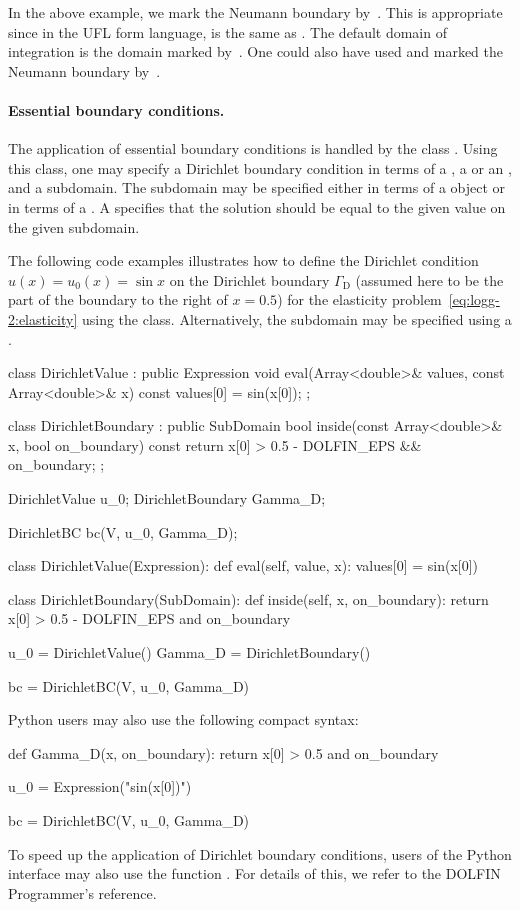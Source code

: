 In the above example, we mark the Neumann boundary by~. This is
appropriate since in the UFL form language,  is the same as
. The default domain of integration is the domain marked
by~. One could also have used  and marked the
Neumann boundary by~.

\paragraph{Essential boundary conditions.}

The application of essential boundary conditions is handled by the
class . Using this class, one may specify a Dirichlet
boundary condition in terms of a , a 
or an , and a subdomain. The subdomain may be
specified either in terms of a  object or in terms of a
. A  specifies that the solution
should be equal to the given value on the given subdomain.

The following code examples illustrates how to define the Dirichlet
condition $u(x) = u_0(x) = \sin x$ on the Dirichlet boundary
$\Gamma_{\mathrm{D}}$ (assumed here to be the part of the boundary
to the right of $x = 0.5$) for the elasticity
problem~\eqref{eq:logg-2:elasticity} using the 
class. Alternatively, the subdomain may be specified using a
.
\begin{c++}
class DirichletValue : public Expression
{
  void eval(Array<double>& values, const Array<double>& x) const
  {
    values[0] = sin(x[0]);
  }
};

class DirichletBoundary : public SubDomain
{
  bool inside(const Array<double>& x, bool on_boundary) const
  {
    return x[0] > 0.5 - DOLFIN_EPS && on_boundary;
  }
};

DirichletValue u_0;
DirichletBoundary Gamma_D;

DirichletBC bc(V, u_0, Gamma_D);
\end{c++}
\begin{python}
class DirichletValue(Expression):
    def eval(self, value, x):
        values[0] = sin(x[0])

class DirichletBoundary(SubDomain):
    def inside(self, x, on_boundary):
        return x[0] > 0.5 - DOLFIN_EPS and on_boundary

u_0 = DirichletValue()
Gamma_D = DirichletBoundary()

bc = DirichletBC(V, u_0, Gamma_D)
\end{python}
Python users may also use the following compact syntax:
\begin{python}
def Gamma_D(x, on_boundary):
    return x[0] > 0.5 and on_boundary

u_0 = Expression("sin(x[0])")

bc = DirichletBC(V, u_0, Gamma_D)
\end{python}
To speed up the application of Dirichlet boundary conditions, users of the
Python interface may also use the function . For
details of this, we refer to the DOLFIN Programmer's reference.

